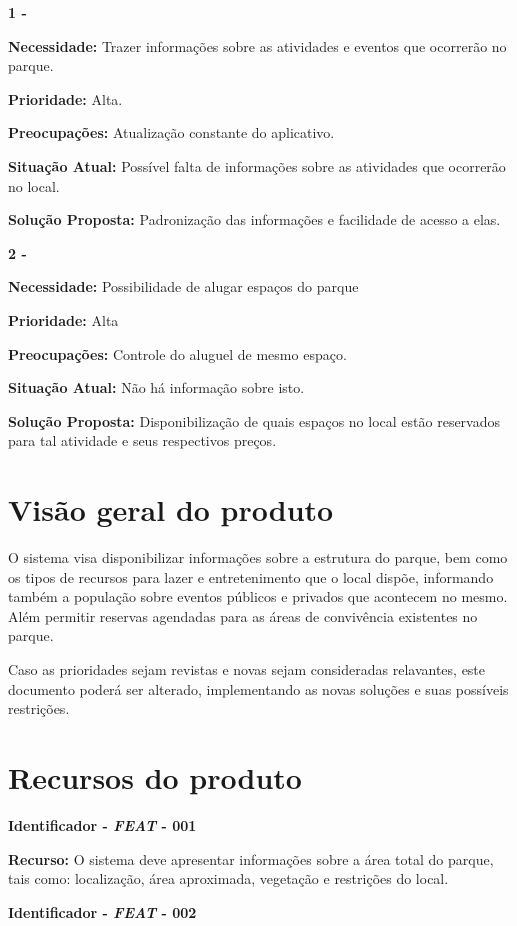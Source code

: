 \begin{anexosenv}
\textbf{1 -}

\textbf{Necessidade:} Trazer informações sobre as atividades e eventos que ocorrerão no parque.

\textbf{Prioridade:} Alta.

\textbf{Preocupações:} Atualização constante do aplicativo.

\textbf{Situação Atual:} Possível falta de informações sobre as atividades que ocorrerão no local.

\textbf{Solução Proposta:} Padronização das informações e facilidade de acesso a elas.

\textbf{2 -}

\textbf{Necessidade:} Possibilidade de alugar espaços do parque 

\textbf{Prioridade:} Alta

\textbf{Preocupações:} Controle do aluguel de mesmo espaço.

\textbf{Situação Atual:} Não há informação sobre isto.

\textbf{Solução Proposta:} Disponibilização de quais espaços no local estão reservados para tal atividade e seus respectivos preços.

\section {Visão geral do produto}

	O sistema visa disponibilizar informações sobre a estrutura do parque, bem como os tipos de recursos para lazer e entretenimento que o local dispõe, informando também a população sobre eventos públicos e privados que acontecem no mesmo. Além permitir reservas agendadas para as áreas de convivência existentes no parque.
	
	Caso as prioridades sejam revistas e novas sejam consideradas relavantes, este documento poderá ser alterado, implementando as novas soluções e suas possíveis restrições.

\section {Recursos do produto}

\textbf{Identificador - \textit{FEAT} - 001} 

\textbf{Recurso:} O sistema deve apresentar informações sobre a área total do parque, tais como: localização, área aproximada, vegetação e restrições do local.

\textbf{Identificador - \textit{FEAT} - 002} 


\end{anexosenv}
